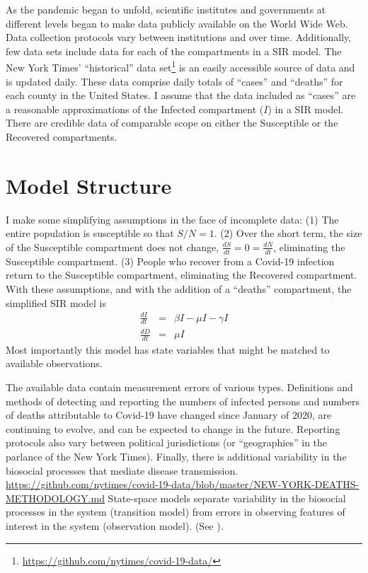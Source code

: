 \documentclass[12pt,letterpaper]{article}
\begin{document}

As the pandemic began to unfold, scientific institutes and governments
at different levels began to make data publicly available on the
World Wide Web.
Data collection protocols vary between institutions and over time. 
Additionally, few data sets include data for each of
the compartments in a SIR model. 
The New York Times' ``historical'' 
data set\footnote{\label{ff:nyt}\url{https://github.com/nytimes/covid-19-data/}}
is an easily accessible source of data and is updated daily. These data
comprise daily totals of ``cases'' and ``deaths'' for each county
in the United States. I assume that the data included as ``cases'' are
a reasonable approximations of the Infected compartment ($I$) in a SIR
model. There are credible data of comparable scope on
either the Susceptible or the Recovered compartments.

\section*{Model Structure}
I make some simplifying assumptions in the face of incomplete data: 
(1) The entire population is susceptible so that $S/N = 1$. 
(2) Over the short term, the size of the
Susceptible compartment does not change, 
$\frac{dS}{dt} = 0 = \frac{dN}{dt}$,
eliminating the Susceptible compartment.
(3) People who recover from a Covid-19 infection return to the Susceptible
compartment, eliminating the Recovered compartment. 
With these assumptions, and with the addition of a ``deaths''
compartment, the simplified SIR model is
\begin{eqnarray}
\label{eqn:sSIRI}
\frac{dI}{dt} &=&  \beta I - \mu I -\gamma I\\
\label{eqn:sSIRD}
\frac{dD}{dt} &=& \mu I
\end{eqnarray}
Most importantly this model
has state variables that might be matched to available observations.

The available data contain measurement errors of various types.
Definitions and methods of detecting and reporting the numbers of
infected persons and numbers of deaths attributable to Covid-19 have
changed since January of 2020, are continuing to evolve, and can be
expected to change in the future.
Reporting protocols also vary between political jurisdictions (or
``geographies'' in the parlance of the New York Times).
Finally, there is additional variability in the biosocial
processes that mediate disease transmission.
\url{https://github.com/nytimes/covid-19-data/blob/master/NEW-YORK-DEATHS-METHODOLOGY.md}
State-space models separate variability in the biosocial
processes in the system (transition model)
from errors in observing features of interest
in the system (observation model).
(See \cite{Harvey1990}).
\end{document}
